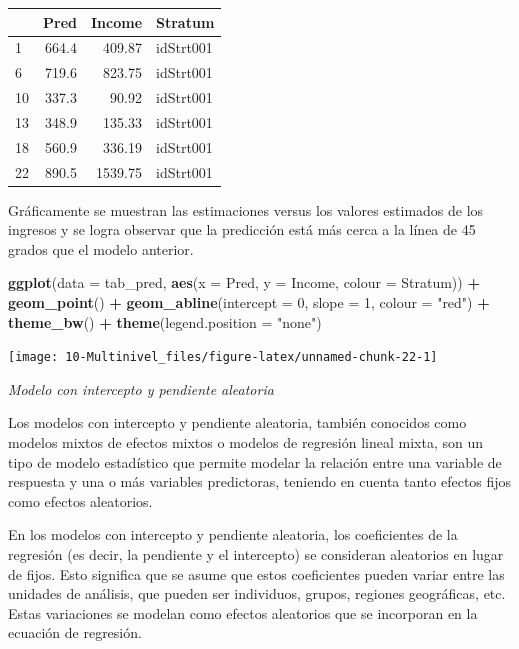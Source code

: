 \documentclass[
  12pt,
]{book}
\newenvironment{Shaded}{\begin{snugshade}}{\end{snugshade}}
\newcommand{\AttributeTok}[1]{\textcolor[rgb]{0.13,0.29,0.53}{#1}}
\newcommand{\DecValTok}[1]{\textcolor[rgb]{0.00,0.00,0.81}{#1}}
\newcommand{\FunctionTok}[1]{\textcolor[rgb]{0.13,0.29,0.53}{\textbf{#1}}}
\newcommand{\NormalTok}[1]{#1}
\newcommand{\SpecialCharTok}[1]{\textcolor[rgb]{0.81,0.36,0.00}{\textbf{#1}}}
\newcommand{\StringTok}[1]{\textcolor[rgb]{0.31,0.60,0.02}{#1}}
\begin{document}
\begin{tabular}{l|r|r|l}
\hline
  & Pred & Income & Stratum\\
\hline
1 & 664.4 & 409.87 & idStrt001\\
\hline
6 & 719.6 & 823.75 & idStrt001\\
\hline
10 & 337.3 & 90.92 & idStrt001\\
\hline
13 & 348.9 & 135.33 & idStrt001\\
\hline
18 & 560.9 & 336.19 & idStrt001\\
\hline
22 & 890.5 & 1539.75 & idStrt001\\
\hline
\end{tabular}

Gráficamente se muestran las estimaciones versus los valores estimados de los ingresos y se logra observar que la predicción está más cerca a la línea de 45 grados que el modelo anterior.

\begin{Shaded}
\begin{Highlighting}[]
\FunctionTok{ggplot}\NormalTok{(}\AttributeTok{data =}\NormalTok{ tab\_pred, }\FunctionTok{aes}\NormalTok{(}\AttributeTok{x =}\NormalTok{ Pred, }\AttributeTok{y =}\NormalTok{ Income, }\AttributeTok{colour =}\NormalTok{ Stratum)) }\SpecialCharTok{+} 
  \FunctionTok{geom\_point}\NormalTok{() }\SpecialCharTok{+} \FunctionTok{geom\_abline}\NormalTok{(}\AttributeTok{intercept =} \DecValTok{0}\NormalTok{, }\AttributeTok{slope =} \DecValTok{1}\NormalTok{, }\AttributeTok{colour =} \StringTok{"red"}\NormalTok{) }\SpecialCharTok{+}
  \FunctionTok{theme\_bw}\NormalTok{() }\SpecialCharTok{+} \FunctionTok{theme}\NormalTok{(}\AttributeTok{legend.position =} \StringTok{"none"}\NormalTok{) }
\end{Highlighting}
\end{Shaded}

\texttt{[image: 10-Multinivel\_files/figure-latex/unnamed-chunk-22-1]}

\emph{Modelo con intercepto y pendiente aleatoria}

Los modelos con intercepto y pendiente aleatoria, también conocidos como modelos mixtos de efectos mixtos o modelos de regresión lineal mixta, son un tipo de modelo estadístico que permite modelar la relación entre una variable de respuesta y una o más variables predictoras, teniendo en cuenta tanto efectos fijos como efectos aleatorios.

En los modelos con intercepto y pendiente aleatoria, los coeficientes de la regresión (es decir, la pendiente y el intercepto) se consideran aleatorios en lugar de fijos. Esto significa que se asume que estos coeficientes pueden variar entre las unidades de análisis, que pueden ser individuos, grupos, regiones geográficas, etc. Estas variaciones se modelan como efectos aleatorios que se incorporan en la ecuación de regresión.
\end{document}
